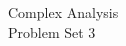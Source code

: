 \documentclass{article}
\begin{document}
    \thispagestyle{fancy}
    \begin{center}
                \LARGE{Complex Analysis \\ Problem Set 3}
    \end{center}
    \vspace{10mm}
\end{document}
